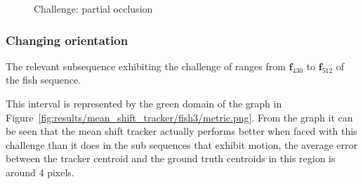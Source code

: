 \begin{figure}
{\begin{tabular}{cccc}
        \end{tabular}}
    \caption{Challenge: partial occlusion\label{fig:mean_shift_partial_occlusion}
 }
\end{figure}

\subsubsection{Changing orientation}
The relevant subsequence exhibiting the challenge of ranges from
$\mathbf{f}_{430}$ to $\mathbf{f}_{512}$ of the fish sequence.  

This interval is represented by the green domain of the graph in
Figure~\ref{fig:results/mean_shift_tracker/fish3/metric.png}. From the graph it can be
seen that the mean shift tracker actually performs better when faced with this
challenge than it does in the sub sequences that exhibit motion, the average error between the
tracker centroid and the ground truth centroids in this region is around 4
pixels. 

